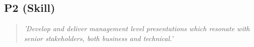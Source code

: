 \subsection{P2 (Skill)}

  \begin{quote}
    \textit{'Develop and deliver management level
    presentations which resonate with senior stakeholders,
    both business and technical.'}
  \end{quote}

\newpage
